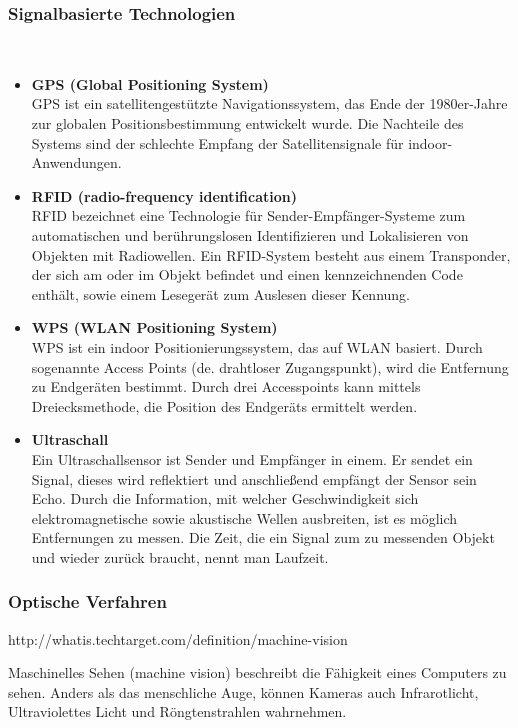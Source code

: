 \begin{itemize}
    \subsubsection{Signalbasierte Technologien}\\
    \begin{itemize}
        \item \textbf{GPS (Global Positioning System)}\\
        GPS ist ein satellitengestützte Navigationssystem, das Ende der 1980er-Jahre zur globalen Positionsbestimmung entwickelt wurde. Die Nachteile des Systems sind der schlechte Empfang der Satellitensignale für indoor- Anwendungen. 
        \item \textbf{RFID (radio-frequency identification)}\\
        RFID bezeichnet eine Technologie für Sender-Empfänger-Systeme zum automatischen und berührungslosen Identifizieren und Lokalisieren von Objekten mit Radiowellen. Ein RFID-System besteht aus einem Transponder, der sich am oder im Objekt befindet und einen kennzeichnenden Code enthält, sowie einem Lesegerät zum Auslesen dieser Kennung. 
        \item \textbf{WPS (WLAN Positioning System)}\\    
        WPS ist ein indoor Positionierungssystem, das auf WLAN basiert. Durch sogenannte  Access Points (de. drahtloser Zugangspunkt), wird die Entfernung zu Endgeräten bestimmt. Durch drei Accesspoints kann mittels Dreiecksmethode, die Position des Endgeräts ermittelt werden.
        \item \textbf{Ultraschall}\\
        Ein Ultraschallsensor ist Sender und Empfänger in einem. Er sendet ein Signal, dieses wird reflektiert und anschließend empfängt der Sensor sein Echo.
        Durch die Information, mit welcher Geschwindigkeit sich elektromagnetische sowie akustische Wellen ausbreiten, ist es möglich Entfernungen zu messen. Die Zeit, die ein Signal zum zu messenden Objekt und wieder zurück braucht, nennt man Laufzeit.
    \end{itemize}

    \subsubsection{Optische Verfahren}
    http://whatis.techtarget.com/definition/machine-vision

    Maschinelles Sehen (machine vision) beschreibt die Fähigkeit eines Computers zu sehen. Anders als das menschliche Auge, können Kameras auch Infrarotlicht, Ultraviolettes Licht und Röngtenstrahlen wahrnehmen. 


\end{itemize}
